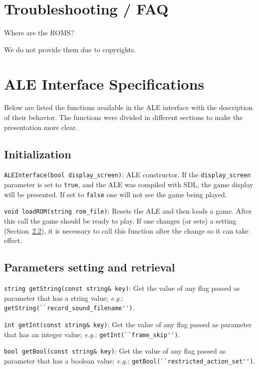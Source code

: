\documentclass[12pt]{article}
\begin{document}
\section{Troubleshooting / FAQ} \label{sec:troubleshooting}

Where are the ROMS?

We do not provide them due to copyrights.

\section{ALE Interface Specifications}\label{sec:functions}

Below are listed the functions available in the ALE interface with the description of their 
behavior. The functions were divided in different sections to make the presentation more
clear.

  \subsection{Initialization}

  \indent \indent \verb+ALEInterface(bool display_screen)+: ALE constructor. If the 
  \verb+display_screen+ parameter is set to \verb+true+, and the ALE was compiled
  with SDL, the game display will be presented. If set to \verb+false+ one will not see
  the game being played.
  
  \verb+void loadROM(string rom_file)+: Resets the ALE and then loads a game. After this call
  the game should be ready to play. If one changes (or sets) a setting (Section~\ref{sec:getSet}), 
  it is necessary to call this function after the change so it can take effect.
  
  \subsection{Parameters setting and retrieval}\label{sec:getSet}
  
  \indent \indent \verb+string getString(const string& key)+: Get the value of any flag passed
  as parameter that has a string value; \emph{e.g.}: \verb+getString(``record_sound_filename'')+.

  \verb+int getInt(const string& key)+: Get the value of any flag passed as parameter that has 
  an integer value; \emph{e.g.}: \verb+getInt(``frame_skip'')+.

  \verb+bool getBool(const string& key)+: Get the value of any flag passed as parameter that has 
  a boolean value; \emph{e.g.}: \verb+getBool(``restricted_action_set'')+. 
  
\end{document}
